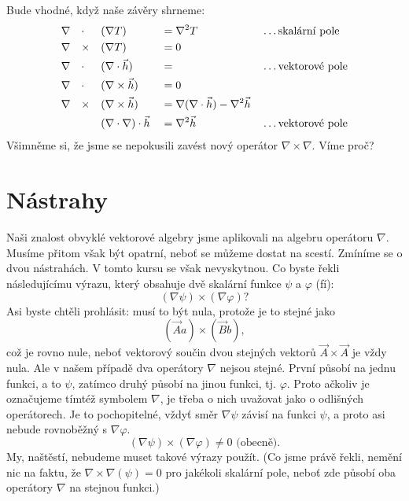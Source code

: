     Bude vhodné, když naše závěry shrneme:
    \begin{alignat*}{5}
      &\nabla && \cdot  && (\nabla T)          &&= \nabla^2 T && \ldots \text{skalární pole}   \\
      &\nabla && \times && (\nabla T)          &&= 0          &&                               \\
      &\nabla && \cdot  && (\nabla\cdot\vec{h})        &&=            && \ldots \text{vektorové pole}  \\
      &\nabla && \cdot  && (\nabla\times\vec{h})          &&= 0          &&                               \\
      &\nabla && \times && (\nabla\times\vec{h})          &&= \nabla(\nabla\cdot\vec{h}) - \nabla^2\vec{h}&&      \\
      &       &&        && (\nabla\cdot\nabla)\cdot\vec{h} &&= \nabla^2\vec{h} && \ldots
      \text{vektorové pole}
    \end{alignat*}
    Všimněme si, že jsme se nepokusili zavést nový operátor \(\nabla\times\nabla\). Víme proč?
    
  \section{Nástrahy}\label{sec:fey_diff_traps}
    \cite[s.~41]{Feynman02} Naši znalost obvyklé vektorové algebry jsme aplikovali na algebru operátoru 
    \(\nabla\). Musíme přitom však být opatrní, neboť se můžeme dostat na scestí. Zmíníme se o dvou 
    nástrahách. V tomto kursu se však nevyskytnou. Co byste řekli následujícímu výrazu, který obsahuje dvě 
    skalární funkce \(\psi\) a \(\varphi\) (fí):
    \begin{equation*}
      (\nabla\psi)\times(\nabla\varphi)? 
    \end{equation*}
    Asi byste chtěli prohlásit: musí to být nula, protože je to stejné jako
    \begin{equation*}
      (\vec{A}a)\times(\vec{B}b),
    \end{equation*}	
    což je rovno nule, neboť vektorový součin dvou stejných vektorů \(\vec{A}\times\vec{A}\) je vždy nula. 
    Ale v našem případě dva operátory \(\nabla\) nejsou stejné. První působí na jednu funkci, a to 
    \(\psi\), zatímco druhý působí na jinou funkci, tj. \(\varphi\). Proto ačkoliv je označujeme tímtéž 
    symbolem  \(\nabla\), je třeba o nich uvažovat jako o odlišných operátorech. Je to pochopitelné, vždyť 
    směr \(\nabla\psi\) závisí na funkci \(\psi\), a proto asi nebude rovnoběžný s \(\nabla\varphi\).
    \begin{equation*}
      (\nabla\psi)\times(\nabla\varphi)\neq0 \text{ (obecně)}. 
    \end{equation*}
    My, naštěstí, nebudeme muset takové výrazy použít. (Co jsme právě řekli, nemění nic na faktu, že 
    \(\nabla\times\nabla(\psi)=0\) pro jakékoli skalární pole, neboť zde působí oba operátory \(\nabla\) na 
    stejnou funkci.)

